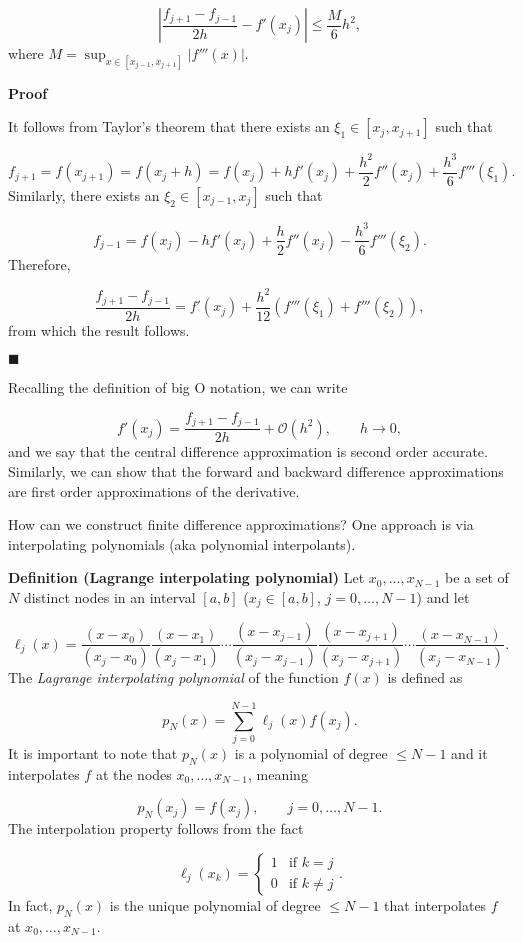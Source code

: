 \documentclass[12pt,a4paper]{article}
\begin{document}
\[
\left\vert\frac{f_{j+1}-f_{j-1}}{2h} - f'(x_j) \right\vert \leq \frac{M}{6}h^2, 
\]
where $M = \sup_{x \in [x_{j-1}, x_{j+1}]} \vert f'''(x) \vert$.

\textbf{Proof}

It follows from Taylor's theorem that there exists an $\xi_1 \in [x_{j}, x_{j+1}]$ such that 

\[
f_{j+ 1} = f(x_{j + 1}) = f(x_j + h) = f(x_j) + h f'(x_j) + \frac{h^2}{2}f''(x_j) + \frac{h^3}{6}f'''(\xi_1).
\]
Similarly, there exists an $\xi_2 \in [x_{j-1}, x_{j}]$ such that 

\[
f_{j- 1} = f(x_j) - h f'(x_j) + \frac{h}{2}f''(x_j) - \frac{h^3}{6}f'''(\xi_2).
\]
Therefore,

\[
\frac{f_{j+1}-f_{j-1}}{2h} = f'(x_j) + \frac{h^2}{12}\left( f'''(\xi_1) + f'''(\xi_2)   \right),
\]
from which the result follows.

\ensuremath{\blacksquare}

Recalling the definition of big O notation, we can write

\[
f'(x_j) = \frac{f_{j+1}-f_{j-1}}{2h} + \mathcal{O}(h^2), \qquad h \to 0,
\]
and we say that the central difference approximation is second order accurate.  Similarly, we can show that the forward and backward difference approximations are first order approximations of the derivative.

How can we construct finite difference approximations?  One approach is via interpolating polynomials (aka polynomial interpolants). 

\textbf{Definition (Lagrange interpolating polynomial)} Let $x_0, \ldots, x_{N-1}$ be a set of $N$ distinct nodes in an interval $[a, b]$ ($x_j \in [a, b]$, $j = 0, \ldots, N-1$) and let

\[
\ell_{j}(x) = \frac{(x-x_0)}{(x_j - x_0)}\frac{(x-x_1)}{(x_j - x_1)}\cdots \frac{(x-x_{j-1})}{(x_j - x_{j-1})}\frac{(x-x_{j+1})}{(x_j - x_{j+1})}\cdots\frac{(x-x_{N-1})}{(x_j - x_{N-1})}.
\]
The \emph{Lagrange interpolating polynomial} of the function $f(x)$ is defined as 

\[
p_N(x) = \sum_{j=0}^{N-1} \ell_j(x) f(x_j).
\]
It is important to note that $p_N(x)$ is a polynomial of degree $\leq N-1$ and it interpolates $f$ at the nodes $x_0, \ldots, x_{N-1}$, meaning

\[
p_N(x_j) = f(x_j), \qquad j = 0, \ldots, N-1.
\]
The interpolation property follows from the fact 

\[
\ell_j(x_k) = \begin{cases}
1 & \text{if } k = j \\
0 & \text{if } k \neq j
\end{cases}.
\]
In fact, $p_N(x)$ is the unique polynomial of degree $\leq N-1$ that interpolates $f$ at $x_0, \ldots, x_{N-1}$.
\end{document}
